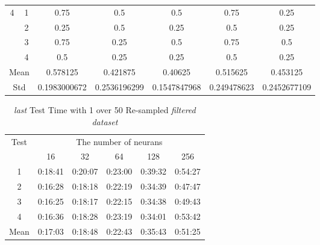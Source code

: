 \documentclass[draft,dvipsnames]{drexel-thesis}
\begin{document}
\begin{thesis}
\begin{table}[!t]
\begin{tabular}{|c|c|c|c|c|c|c|}
\multirow{4}{*}{4}    & 1                   & 0.75         & 0.5          & 0.5          & 0.75        & 0.25         \\ \cline{2-7} 
                      & 2                   & 0.25         & 0.5          & 0.25         & 0.5         & 0.25         \\ \cline{2-7} 
                      & 3                   & 0.75         & 0.25         & 0.5          & 0.75        & 0.5          \\ \cline{2-7} 
                      & 4                   & 0.5          & 0.25         & 0.25         & 0.5         & 0.25         \\ \hline
\multicolumn{2}{|c|}{Mean}                  & 0.578125     & 0.421875     & 0.40625      & 0.515625    & 0.453125     \\ \hline
\multicolumn{2}{|c|}{Std}                   & 0.1983000672 & 0.2536196299 & 0.1547847968 & 0.249478623 & 0.2452677109 \\ \hline
\end{tabular}
\end{table}

\begin{table}[!t]
\centering
\caption{{\em last} Test Time with 1 over 50 Re-sampled {\em filtered dataset}}
\label{tbl:last_1_50_time}
\begin{tabular}{|c|c|c|c|c|c|}
\hline
\multirow{2}{*}{Test}      & \multicolumn{5}{c|}{The number of neurans}                                                                                                               \\ \cline{2-6} 
                           & 16                           & 32                           & 64                           & 128                          & 256                          \\ \hline
1                          & 0:18:41                      & 0:20:07                      & 0:23:00                      & 0:39:32                      & 0:54:27                      \\ \hline
2                          & 0:16:28                      & 0:18:18                      & 0:22:19                      & 0:34:39                      & 0:47:47                      \\ \hline
3                          & 0:16:25                      & 0:18:17                      & 0:22:15                      & 0:34:38                      & 0:49:43                      \\ \hline
4                          & 0:16:36                      & 0:18:28                      & 0:23:19                      & 0:34:01                      & 0:53:42                      \\ \hline
\multicolumn{1}{|l|}{Mean} & \multicolumn{1}{l|}{0:17:03} & \multicolumn{1}{l|}{0:18:48} & \multicolumn{1}{l|}{0:22:43} & \multicolumn{1}{l|}{0:35:43} & \multicolumn{1}{l|}{0:51:25} \\ \hline
\end{tabular}
\end{table}


\end{thesis}
\end{document}
